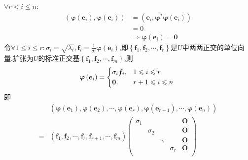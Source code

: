 \begin{formal}
\begin{Proof}
            $\forall r<i\leqslant n:$
            \begin{align*}
                \left(
                    \bm{\varphi}\left(
                        \bm{e}_i
                    \right),\bm{\varphi}\left(
                        \bm{e}_i
                        \right)
                \right)&=\left(
                    \bm{e}_i,\bm{\varphi}^*\bm{\varphi}\left(
                        \bm{e}_i
                        \right)
                \right)\\
                &=0\\
                &\Longrightarrow\bm{\varphi}\left(
                    \bm{e}_i
                \right)=\bm{0}
            \end{align*}令$\displaystyle\forall1\leqslant i\leqslant r:\sigma_i=\sqrt{\lambda_i},\bm{f}_i=\frac{1}{\sigma_i}\bm{\varphi}\left(\bm{e}_i\right)$,即$\left\{
                \bm{f}_1,\bm{f}_2,\cdots,\bm{f}_r
            \right\}$是$U$中两两正交的单位向量,扩张为$U$的标准正交基$\left\{
                \bm{f}_1,\bm{f}_2,\cdots,\bm{f}_m
                \right\}$,则\[
                \bm{\varphi}\left(\bm{e}_i\right)=\begin{cases*}
                    \sigma_i\bm{f}_i,&$1\leqslant i\leqslant r$\\
                    \bm{0},&$r+1\leqslant i\leqslant n$
                \end{cases*}
                \]即\begin{align*}
                &\left(
                    \bm{\varphi}\left(
                        \bm{e}_1
                    \right),\bm{\varphi}\left(
                        \bm{e}_2
                        \right)
                        ,\cdots,\bm{\varphi}\left(
                            \bm{e}_r
                            \right),\bm{\varphi}\left(
                                \bm{e}_{r+1}
                                \right),\cdots,\bm{\varphi}\left(
                                    \bm{e}_n
                                    \right)
                \right)\\
                =&\left(
                    \bm{f}_1,\bm{f}_2,\cdots,\bm{f}_r,\bm{f}_{r+1},\cdots,\bm{f}_m
                \right)\begin{pmatrix}
                    \sigma_1&&&&\bm{O}\\
                    &\sigma_2&&&\bm{O}\\
                    &&\ddots&&\bm{O}\\
                    &&&\sigma_r&\bm{O}\\

\end{pmatrix}
\end{align*}
\end{Proof}
\end{formal}

